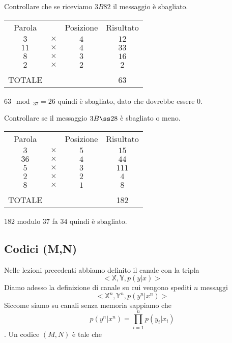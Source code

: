 \documentclass[12pt]{report}
\begin{document}
    \begin{es}
        Controllare che se riceviamo $3B82$ il messaggio è sbagliato.
        \vspace{10px}
        \begin{center}
            \begin{tabular}{cccc}
                Parola & & Posizione & Risultato \\
                $3$ & $\times$ & $4$ & $12$ \\
                $11$ & $\times$ & $4$ & $33$ \\
                $8$ & $\times$ & $3$ & $16$ \\
                $2$ & $\times$ & $2$ & $2$ \\
                & &  &  \\
                TOTALE & &  & 63  \\
            \end{tabular}
        \end{center}

        \noindent
        $63\mod_{37} = 26$ quindi è sbagliato, dato che dovrebbe essere $0$.
    \end{es}

    \begin{es}
        Controllare se il messaggio $3B\ss28$ è sbagliato o meno.
        \vspace{10px}
        \begin{center}
            \begin{tabular}{cccc}
                Parola & & Posizione & Risultato \\
                $3$ & $\times$ & $5$ & $15$ \\
                $36$ & $\times$ & $4$ & $44$ \\
                $5$ & $\times$ & $3$ & $111$ \\
                $2$ & $\times$ & $2$ & $4$ \\
                $8$ & $\times$ & $1$ & $8$ \\
                & &  &  \\
                TOTALE & &  & 182  \\
            \end{tabular}
        \end{center}
        $182$ modulo $37$ fa $34$ quindi è sbagliato.
    \end{es}

    \subsection{Codici (M,N)}
    Nelle lezioni precedenti abbiamo definito il canale con la tripla
    $$<\mathbb{X},\mathbb{Y},p(y|x)>$$
    Diamo adesso la definizione di canale su cui vengono spediti $n$ messaggi
    $$<\mathbb{X}^n,\mathbb{Y}^n,p(y^n|x^n)>$$
    Siccome siamo su canali senza memoria sappiamo che
    $$p(y^n|x^n) = \prod_{i=1}^n p(y_i|x_i)$$. Un codice $(M,N)$ è tale che
\end{document}
